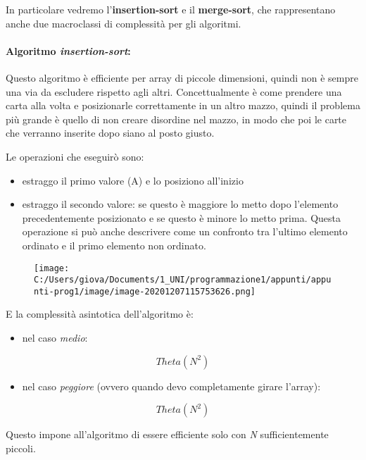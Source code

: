 \documentclass[
]{article}
\begin{document}
In particolare vedremo l'\textbf{insertion-sort} e il
\textbf{merge-sort}, che rappresentano anche due macroclassi di
complessità per gli algoritmi.

\hypertarget{header-n1618}{%
\paragraph{\texorpdfstring{Algoritmo
\emph{insertion-sort}:}{Algoritmo insertion-sort:}}\label{header-n1618}}

Questo algoritmo è efficiente per array di piccole dimensioni, quindi
non è sempre una via da escludere rispetto agli altri. Concettualmente è
come prendere una carta alla volta e posizionarle correttamente in un
altro mazzo, quindi il problema più grande è quello di non creare
disordine nel mazzo, in modo che poi le carte che verranno inserite dopo
siano al posto giusto.

Le operazioni che eseguirò sono:

\begin{itemize}
\item
  estraggo il primo valore (A) e lo posiziono all'inizio
\item
  estraggo il secondo valore: se questo è maggiore lo metto dopo
  l'elemento precedentemente posizionato e se questo è minore lo metto
  prima. Questa operazione si può anche descrivere come un confronto tra
  l'ultimo elemento ordinato e il primo elemento non ordinato.
\end{itemize}

\begin{figure}
\centering
\texttt{[image: C:/Users/giova/Documents/1\_UNI/programmazione1/appunti/appunti-prog1/image/image-20201207115753626.png]}
\caption{}
\end{figure}

E la complessità asintotica dell'algoritmo è:

\begin{itemize}
\item
  nel caso \emph{medio}:
\end{itemize}

\[Theta(N^2)\]

\begin{itemize}
\item
  nel caso \emph{peggiore} (ovvero quando devo completamente girare
  l'array):
\end{itemize}

\[Theta(N^2)\]

Questo impone all'algoritmo di essere efficiente solo con \emph{N}
sufficientemente piccoli.
\end{document}
